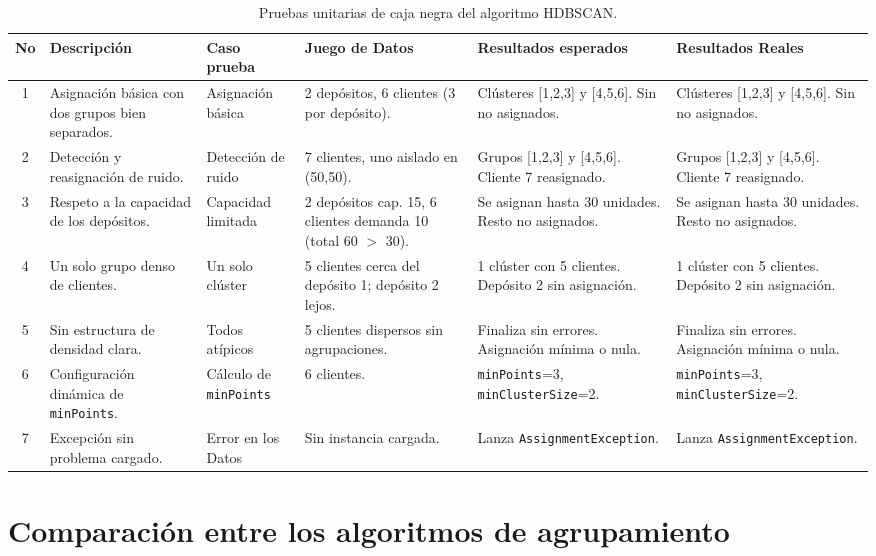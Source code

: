 \clearpage
\begin{landscape}
\begin{table}[htbp]
\centering
\caption{Pruebas unitarias de caja negra del algoritmo HDBSCAN.}
\label{tab:pruebas_hdbscan}
\footnotesize
\renewcommand{\arraystretch}{1.2}
\begin{tabular}{@{}cp{2.8cm}p{2.2cm}p{3.2cm}p{5cm}p{5cm}@{}}
\toprule
\textbf{No} & \textbf{Descripci\'on} & \textbf{Caso prueba} & \textbf{Juego de Datos} & \textbf{Resultados esperados} & \textbf{Resultados Reales} \\
\midrule
1 & Asignaci\'on b\'asica con dos grupos bien separados. & Asignaci\'on b\'asica & 2 dep\'ositos, 6 clientes (3 por dep\'osito). & Cl\'usteres [1,2,3] y [4,5,6]. Sin no asignados. & Cl\'usteres [1,2,3] y [4,5,6]. Sin no asignados. \\
2 & Detecci\'on y reasignaci\'on de ruido. & Detecci\'on de ruido & 7 clientes, uno aislado en (50,50). & Grupos [1,2,3] y [4,5,6]. Cliente 7 reasignado. & Grupos [1,2,3] y [4,5,6]. Cliente 7 reasignado. \\
3 & Respeto a la capacidad de los dep\'ositos. & Capacidad limitada & 2 dep\'ositos cap. 15, 6 clientes demanda 10 (total 60 $>$ 30). & Se asignan hasta 30 unidades. Resto no asignados. & Se asignan hasta 30 unidades. Resto no asignados. \\
4 & Un solo grupo denso de clientes. & Un solo cl\'uster & 5 clientes cerca del dep\'osito 1; dep\'osito 2 lejos. & 1 cl\'uster con 5 clientes. Dep\'osito 2 sin asignaci\'on. & 1 cl\'uster con 5 clientes. Dep\'osito 2 sin asignaci\'on. \\
5 & Sin estructura de densidad clara. & Todos at\'ipicos & 5 clientes dispersos sin agrupaciones. & Finaliza sin errores. Asignaci\'on m\'inima o nula. & Finaliza sin errores. Asignaci\'on m\'inima o nula. \\
6 & Configuraci\'on din\'amica de \texttt{minPoints}. & C\'alculo de \texttt{minPoints} & 6 clientes. & \texttt{minPoints}=3, \texttt{minClusterSize}=2. & \texttt{minPoints}=3, \texttt{minClusterSize}=2. \\
7 & Excepci\'on sin problema cargado. & Error en los Datos & Sin instancia cargada. & Lanza \texttt{AssignmentException}. & Lanza \texttt{AssignmentException}. \\
\bottomrule
\end{tabular}
\end{table}
\end{landscape}
\clearpage

\section{Comparaci\'on entre los algoritmos de agrupamiento}

